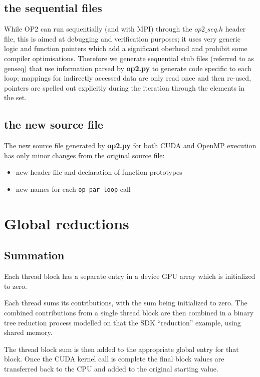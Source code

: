 \documentclass[12pt]{article}
\begin{document}
\subsection{the sequential files}

While OP2 can run sequentially (and with MPI) through the $op2\_seq.h$
header file, this is aimed at debugging and verification purposes; it uses
very generic logic and function pointers which add a significant oberhead
and prohibit some compiler optimisations. Therefore we generate
sequential stub files (referred to as genseq) that use information parsed by
 {\bf op2.py} to generate code specific to each loop; mappings for indirectly
 accessed data are only read once and then re-used, pointers are spelled
 out explicitly during the iteration through the elements in the set.

\subsection{the new source file}

The new source file generated by {\bf op2.py} for both CUDA and OpenMP
execution has only minor changes from the original source file:
\begin{itemize}
\item
new header file and declaration of function prototypes

\item
new names for each {\tt op\_par\_loop} call
\end{itemize}

\newpage

\section{Global reductions}

\subsection{Summation}

Each thread block has a separate entry in a device GPU array which is
initialized to zero.

Each thread sums its contributions, with the sum being initialized to zero.
The combined contributions from a single thread block are then combined
in a binary tree reduction process modelled on that the SDK ``reduction''
example, using shared memory.

The thread block sum is then added to the appropriate global entry for that
block.  Once the CUDA kernel call is complete the final block values are
transferred back to the CPU and added to the original starting value.
\end{document}
